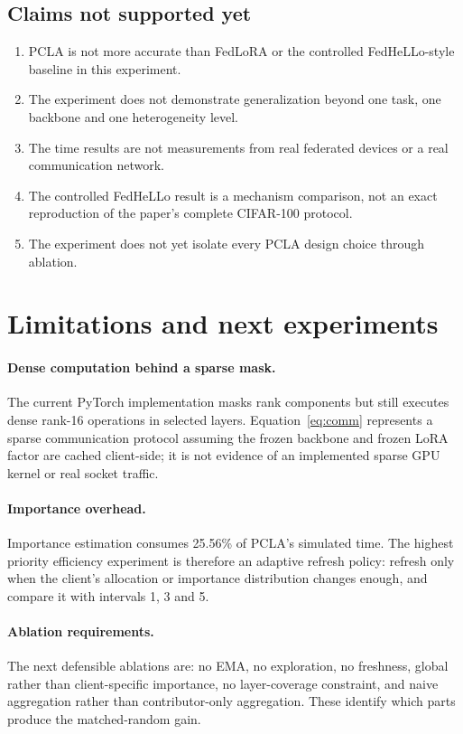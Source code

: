 \documentclass[11pt,a4paper]{article}
\begin{document}
\subsection{Claims not supported yet}

\begin{enumerate}[leftmargin=1.6em]
  \item PCLA is not more accurate than FedLoRA or the controlled FedHeLLo-style
  baseline in this experiment.
  \item The experiment does not demonstrate generalization beyond one task,
  one backbone and one heterogeneity level.
  \item The time results are not measurements from real federated devices or a
  real communication network.
  \item The controlled FedHeLLo result is a mechanism comparison, not an exact
  reproduction of the paper's complete CIFAR-100 protocol.
  \item The experiment does not yet isolate every PCLA design choice through
  ablation.
\end{enumerate}

\section{Limitations and next experiments}

\paragraph{Dense computation behind a sparse mask.}
The current PyTorch implementation masks rank components but still executes
dense rank-16 operations in selected layers. Equation~\ref{eq:comm} represents
a sparse communication protocol assuming the frozen backbone and frozen LoRA
factor are cached client-side; it is not evidence of an implemented sparse GPU
kernel or real socket traffic.

\paragraph{Importance overhead.}
Importance estimation consumes 25.56\% of PCLA's simulated time. The highest
priority efficiency experiment is therefore an adaptive refresh policy:
refresh only when the client's allocation or importance distribution changes
enough, and compare it with intervals 1, 3 and 5.

\paragraph{Ablation requirements.}
The next defensible ablations are: no EMA, no exploration, no freshness,
global rather than client-specific importance, no layer-coverage constraint,
and naive aggregation rather than contributor-only aggregation. These identify
which parts produce the matched-random gain.
\end{document}
